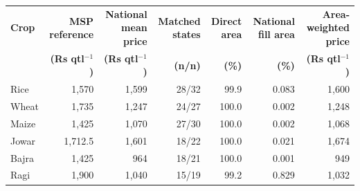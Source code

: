 \begin{tabular}{lrrrrrr}
\toprule
\textbf{Crop} & \textbf{MSP reference} & \textbf{National mean price} & \textbf{Matched states} & \textbf{Direct area} & \textbf{National fill area} & \textbf{Area-weighted price} \\
 & \textbf{(Rs qtl$^{-1}$)} & \textbf{(Rs qtl$^{-1}$)} & \textbf{(n/n)} & \textbf{(\%)} & \textbf{(\%)} & \textbf{(Rs qtl$^{-1}$)} \\
\midrule
Rice & 1,570 & 1,599 & 28/32 & 99.9 & 0.083 & 1,600 \\
Wheat & 1,735 & 1,247 & 24/27 & 100.0 & 0.002 & 1,248 \\
Maize & 1,425 & 1,070 & 27/30 & 100.0 & 0.002 & 1,068 \\
Jowar & 1,712.5 & 1,601 & 18/22 & 100.0 & 0.021 & 1,674 \\
Bajra & 1,425 & 964 & 18/21 & 100.0 & 0.001 & 949 \\
Ragi & 1,900 & 1,040 & 15/19 & 99.2 & 0.829 & 1,032 \\
\bottomrule
\end{tabular}
